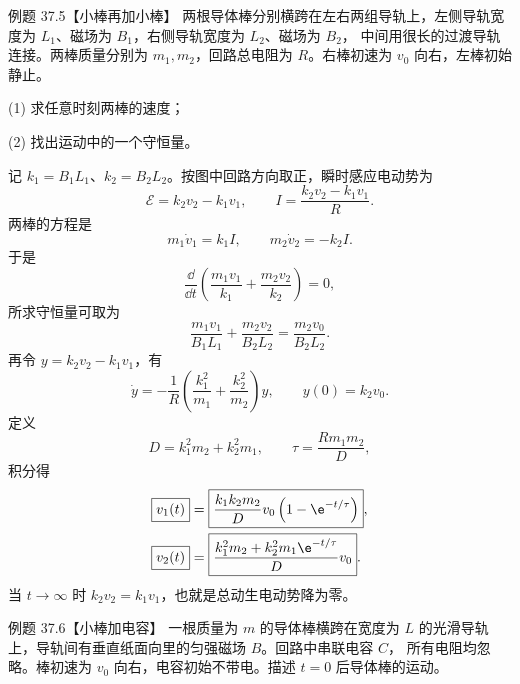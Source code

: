 \Needspace{0.12\textheight}
\begin{origexamplebox}{例题 37.5【小棒再加小棒】}
两根导体棒分别横跨在左右两组导轨上，左侧导轨宽度为 $L_1$、磁场为 $B_1$，右侧导轨宽度为 $L_2$、磁场为 $B_2$，
中间用很长的过渡导轨连接。两棒质量分别为 $m_1,m_2$，回路总电阻为 $R$。右棒初速为 $v_0$ 向右，左棒初始静止。

(1) 求任意时刻两棒的速度；

(2) 找出运动中的一个守恒量。
\end{origexamplebox}

\begin{xesolution}
记 $k_1=B_1L_1$、$k_2=B_2L_2$。按图中回路方向取正，瞬时感应电动势为
\begin{equation}
  \mathcal E=k_2v_2-k_1v_1,
  \qquad I=\frac{k_2v_2-k_1v_1}{R}.
\end{equation}
两棒的方程是
\begin{equation}
  m_1\dot v_1=k_1I,
  \qquad m_2\dot v_2=-k_2I.
\end{equation}
于是
\begin{equation}
  \frac{\dd}{\dd t}\left(\frac{m_1v_1}{k_1}+\frac{m_2v_2}{k_2}\right)=0,
\end{equation}
所求守恒量可取为
\begin{equation}
  \boxed{\frac{m_1v_1}{B_1L_1}+\frac{m_2v_2}{B_2L_2}
  =\frac{m_2v_0}{B_2L_2}}.
\end{equation}
再令 $y=k_2v_2-k_1v_1$，有
\begin{equation}
  \dot y=-\frac1R\left(\frac{k_1^2}{m_1}+\frac{k_2^2}{m_2}\right)y,
  \qquad
  y(0)=k_2v_0.
\end{equation}
定义
\begin{equation}
  D=k_1^2m_2+k_2^2m_1,
  \qquad \tau=\frac{Rm_1m_2}{D},
\end{equation}
积分得
\begin{align}
  \boxed{v_1(t)}&=\boxed{\frac{k_1k_2m_2}{D}v_0\left(1-\e^{-t/\tau}\right)},\\
  \boxed{v_2(t)}&=\boxed{\frac{k_1^2m_2+k_2^2m_1\e^{-t/\tau}}{D}v_0}.
\end{align}
当 $t\to\infty$ 时 $k_2v_2=k_1v_1$，也就是总动生电动势降为零。

\unequalRodDiagram
\end{xesolution}

\Needspace{0.12\textheight}
\begin{origexamplebox}{例题 37.6【小棒加电容】}
一根质量为 $m$ 的导体棒横跨在宽度为 $L$ 的光滑导轨上，导轨间有垂直纸面向里的匀强磁场 $B$。回路中串联电容 $C$，
所有电阻均忽略。棒初速为 $v_0$ 向右，电容初始不带电。描述 $t=0$ 后导体棒的运动。
\end{origexamplebox}


